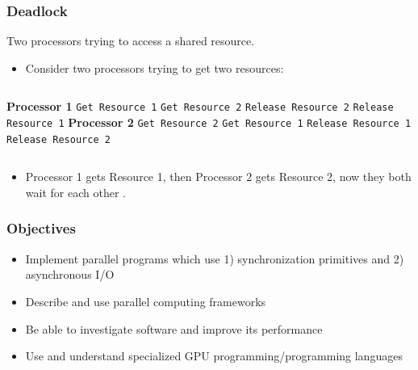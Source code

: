 \documentclass[aspectratio=43]{beamer}
\begin{document}
\begin{frame}[containsverbatim]
  \frametitle{Deadlock}

Two processors trying to access a shared resource.
  \begin{itemize}
    \item Consider two processors trying to get two resources:
  \end{itemize}
  \begin{columns}
      {\bf Processor 1}
      \verb+Get Resource 1+
      \verb+Get Resource 2+
      \verb+Release Resource 2+
      \verb+Release Resource 1+
      {\bf Processor 2}
      \verb+Get Resource 2+
      \verb+Get Resource 1+
      \verb+Release Resource 1+
      \verb+Release Resource 2+
    \end{columns}
  \vfill
  \begin{itemize}
    \item Processor 1 gets Resource 1, then Processor 2 gets Resource 2, now
          they both wait for each other .
  \end{itemize}
\end{frame}

\begin{frame}
  \frametitle{Objectives}

  \begin{itemize}
    \item Implement parallel programs which use 1) synchronization primitives and 2) asynchronous I/O
    \vfill
    \item Describe and use parallel computing frameworks
    \vfill
    \item Be able to investigate software and improve its performance
    \vfill
    \item Use and understand specialized GPU programming/programming languages
  \end{itemize}
\end{frame}
\end{document}
